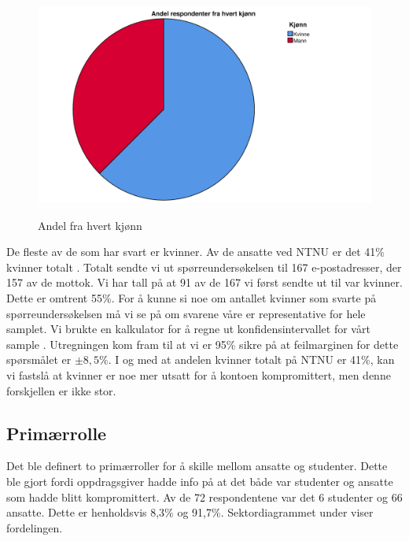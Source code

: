 \begin{figure}[H]
    \centering
    \includegraphics[scale=0.5]{case_2/bilder/spss/kjonn.pdf}
    \label{fig:kjonn}
    \caption[kjonn]{Andel fra hvert kjønn}
\end{figure}

De fleste av de som har svart er kvinner. Av de ansatte ved NTNU er det 41\% kvinner totalt \cite{NTNUfakta}. Totalt sendte vi ut spørreundersøkelsen til 167 e-postadresser, der 157 av de mottok. Vi har tall på at 91 av de 167 vi først sendte ut til var kvinner. Dette er omtrent 55\%. For å kunne si noe om antallet kvinner som svarte på spørreundersøkelsen må vi se på om svarene våre er representative for hele samplet. Vi brukte en kalkulator for å regne ut konfidensintervallet for vårt sample \cite{SSCalc}. Utregningen kom fram til at vi er 95\% sikre på at feilmarginen for dette spørsmålet er \(\pm 8,5\%\). I og med at andelen kvinner totalt på NTNU er 41\%, kan vi fastslå at kvinner er noe mer utsatt for å kontoen kompromittert, men denne forskjellen er ikke stor. 

\subsection{Primærrolle}
Det ble definert to primærroller for å skille mellom ansatte og studenter. Dette ble gjort fordi oppdragsgiver hadde info på at det både var studenter og ansatte som hadde blitt kompromittert. Av de 72 respondentene var det 6 studenter og 66 ansatte. Dette er henholdsvis 8,3\% og 91,7\%. Sektordiagrammet under viser fordelingen. 

